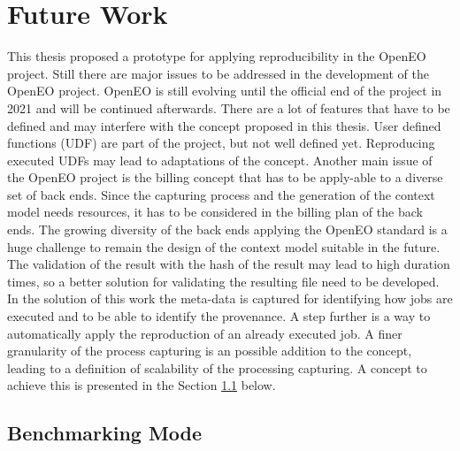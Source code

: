 \documentclass[draft,final]{vutinfth} %
\begin{document}
\section{Future Work}\label{FutureWork}
This thesis proposed a prototype for applying reproducibility in the OpenEO project. Still there are major issues to be addressed in the development of the OpenEO project. 
OpenEO is still evolving until the official end of the project in 2021 and will be continued afterwards. There are a lot of features that have to be defined and may interfere with the concept proposed in this thesis. User defined functions (UDF) are part of the project, but not well defined yet. Reproducing executed UDFs may lead to adaptations of the concept. Another main issue of the OpenEO project is the billing concept that has to be apply-able to a diverse set of back ends. Since the capturing process and the generation of the context model needs resources, it has to be considered in the billing plan of the back ends. The growing diversity of the back ends applying the OpenEO standard is a huge challenge to remain the design of the context model suitable in the future. \\
The validation of the result with the hash of the result may lead to high duration times, so a better solution for validating the resulting file need to be developed.
In the solution of this work the meta-data is captured for identifying how jobs are executed and to be able to identify the provenance. A step further is a way to automatically apply the reproduction of an already executed job. A finer granularity of the process capturing is an possible addition to the concept, leading to a definition of scalability of the processing capturing. A concept to achieve this is presented in the Section \ref{Job:Benchmarking} below. 

\subsection{Benchmarking Mode}\label{Job:Benchmarking}
\end{document}
